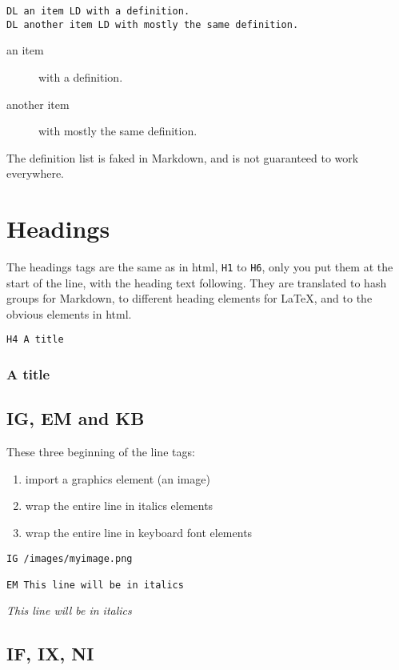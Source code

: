 \begin{verbatim}
DL an item LD with a definition.
DL another item LD with mostly the same definition.
\end{verbatim}
\begin{description}
\item[an item] with a definition.
\item[another item] with mostly the same definition.
\end{description}

The definition list is faked in Markdown, and is not guaranteed to work everywhere.

\chapter{Headings}
\label{headings}

The headings tags are the same as in html, \texttt{H1} to \texttt{H6}, only you put them at the start of the line, with the heading text following. They are translated to hash groups for Markdown, to different heading elements for \LaTeX{}, and to the obvious elements in html.

\begin{verbatim}
H4 A title
\end{verbatim}
\subsection{A title}
\label{a-title}
\section{IG, EM and KB}
\label{ig,-em-and-kb}

These three beginning of the line tags:

\begin{enumerate}
\item  import a graphics element (an image)
\item  wrap the entire line in italics elements
\item  wrap the entire line in keyboard font elements
\end{enumerate}
\begin{verbatim}
IG /images/myimage.png

EM This line will be in italics
\end{verbatim}

\emph{This line will be in italics}

\section{IF, IX, NI}
\label{if,-ix,-ni}

